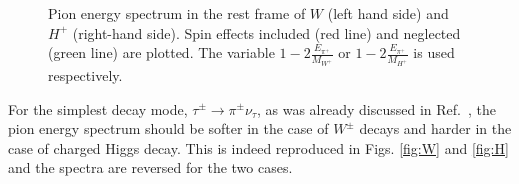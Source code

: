 \documentclass[]{Tauola_interface_design}
\begin{document}
\begin{figure}[h!]
\centering 
{}
\caption{ 
 Pion energy
spectrum in the rest frame of $W$ (left hand side) and $H^+$ (right-hand side).  
Spin effects included (red line) and neglected
(green line) are plotted.   The variable $1-2\frac{E_{\pi^+}}{M_{W^+}}$ or
$1-2\frac{E_{\pi^+}}{M_{H^+}}$ is  used respectively.}
\end{figure}





For the simplest decay mode, $\tau^{\pm}\rightarrow \pi^{\pm} \nu_{\tau}$,  
as was already discussed in Ref.~\cite{Pierzchala:2001gc}, 
the pion energy spectrum
should be softer  in the case of $W^\pm$ decays and harder in the case of charged Higgs decay.
This is indeed reproduced in Figs. \ref{fig:W} and \ref{fig:H}
and  the spectra are reversed for the two cases.
\end{document}
